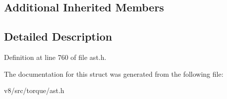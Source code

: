 \subsection*{Additional Inherited Members}


\subsection{Detailed Description}


Definition at line 760 of file ast.\+h.



The documentation for this struct was generated from the following file\+:\begin{DoxyCompactItemize}
\item 
v8/src/torque/ast.\+h\end{DoxyCompactItemize}
